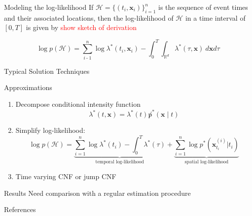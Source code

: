\documentclass{beamer}
\begin{document}
\begin{frame}{Modeling the log-likelihood}
If $\mathcal{H}=\{(t_i,\boldsymbol{x}_i)\}_{i=1}^n$ is the sequence of event times and their associated locations, 
then the log-likelihood of $\mathcal{H}$ in a time interval of $[0, T]$ is given by \textcolor{red}{show sketch of derivation}

\begin{equation*}
    \log p\left(\mathcal{H}\right)=\sum_{i\operatorname{-}1}^n\log\lambda^*(t_i,\boldsymbol{x}_i)-\int_0^T\int_{\mathbb{R}^d}\lambda^*(\tau,\boldsymbol{x})\mathrm{~}d\boldsymbol{x}d\tau 
\end{equation*}
\end{frame}

\begin{frame}{Typical Solution Techniques}
    
\end{frame}

\begin{frame}{Approximations}
\begin{enumerate}
    \item Decompose conditional intensity function
    $$\lambda^*(t,\boldsymbol{x})=\lambda^*(t)\not p^*(\boldsymbol{x}\mid t)$$
    \item Simplify log-likelihood:
    $$\log p(\mathcal{H})=\underbrace{\sum_{i=1}^n\log\lambda^*(t_i)-\int_0^T\lambda^*(\tau)}_{\text{temporal log-likelihood}}+\underbrace{\sum_{i=1}^n\log p^*(\boldsymbol{x}_{t_i}^{(i)}|t_i)}_{\text{spatial log-likelihood}}$$
    \item Time varying CNF or jump CNF
\end{enumerate}
    
\end{frame}

\begin{frame}{Results}
    Need comparison with a regular estimation procedure
\end{frame}

\begin{frame}{References}
    \nocite{*}
    \printbibliography
\end{frame}
\end{document}
